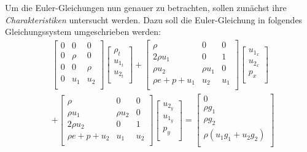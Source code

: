 Um die Euler-Gleichungen nun genauer zu betrachten, sollen zunächst ihre \emph{Charakteristiken} untersucht werden.
Dazu soll die Euler-Gleichung in folgendes Gleichungssystem umgeschrieben werden:
\begin{align}
\label{eq:euler_system}
    &\begin{bmatrix}
        0 & 0 & 0 \\
        0 & \rho  & 0 \\
        0 & 0 & \rho \\
        0 & u_1   & u_2 \\
    \end{bmatrix}
    \begin{bmatrix}
        \rho_t \\
        u_{1_t} \\
        u_{2_t} \\
    \end{bmatrix}
    +
    \begin{bmatrix}
        \rho & 0 & 0 \\
        2\rho u_1 & 0 & 1 \\
        \rho u_2 & \rho u_1 & 0 \\
        \rho e + p + u_1 & u_2 & u_1 \\
    \end{bmatrix}
    \begin{bmatrix}
        u_{1_x} \\
        u_{2_x} \\
        p_x \\
    \end{bmatrix} \\
    &+
    \begin{bmatrix}
    \rho             & 0 & 0 \\
    \rho u_1         & \rho u_2 & 0 \\
    2\rho u_2        & 0 & 1 \\
    \rho e + p + u_2 & u_1 & u_2 \\
    \end{bmatrix}
    \begin{bmatrix}
        u_{2_y} \\
        u_{1_y} \\
        p_y \\
    \end{bmatrix}
    =
    \begin{bmatrix}
        0 \\
        \rho g_1 \\
        \rho g_2 \\
        \rho (u_1 g_1 + u_2 g_2)\\
    \end{bmatrix}
\end{align}
